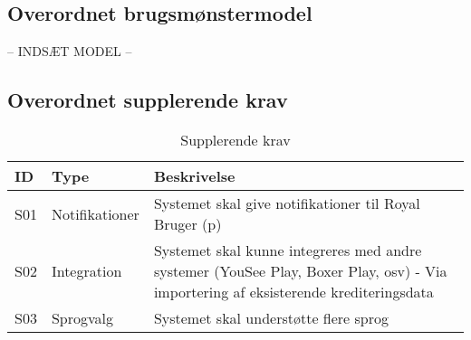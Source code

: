\subsection{Overordnet brugsmønstermodel}
-- INDSÆT MODEL --

\subsection{Overordnet supplerende krav}
\begin{table}
\centering
\begin{tabular}{ |p{2cm}|p{2.5cm}|p{7cm}| }
\hline
\textbf{ID} & \textbf{Type} & \textbf{Beskrivelse} \\
\hline
S01 & Notifikationer & Systemet skal give notifikationer til Royal Bruger (p) \\
\hline
S02 & Integration & Systemet skal kunne integreres med andre systemer (YouSee Play, Boxer Play, osv) - Via importering af eksisterende krediteringsdata \\
\hline
S03 & Sprogvalg & Systemet skal understøtte flere sprog \\ 
\hline
\end{tabular}
\caption{Supplerende krav}
\label{table:1}
\end{table}